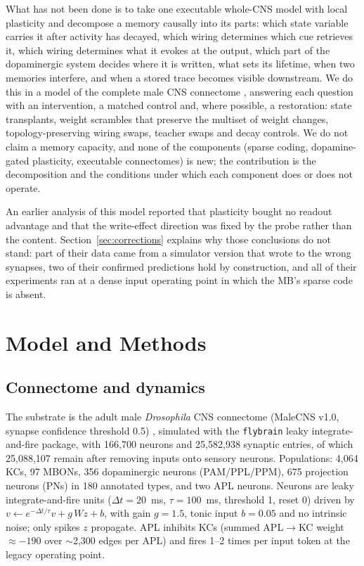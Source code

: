 \documentclass[conference]{IEEEtran}
\begin{document}
What has not been done is to take one executable whole-CNS model with local
plasticity and decompose a memory causally into its parts: which state variable
carries it after activity has decayed, which wiring determines which cue
retrieves it, which wiring determines what it evokes at the output, which part
of the dopaminergic system decides where it is written, what sets its lifetime,
when two memories interfere, and when a stored trace becomes visible
downstream. We do this in a model of the complete male CNS connectome
\cite{berg2026}, answering each question with an intervention, a matched
control and, where possible, a restoration: state transplants, weight scrambles
that preserve the multiset of weight changes, topology-preserving wiring swaps,
teacher swaps and decay controls. We do not claim a memory capacity, and none
of the components (sparse coding, dopamine-gated plasticity, executable
connectomes) is new; the contribution is the decomposition and the conditions
under which each component does or does not operate.

An earlier analysis of this model \cite{olddraft} reported that plasticity
bought no readout advantage and that the write-effect direction was fixed by
the probe rather than the content. Section~\ref{sec:corrections} explains why
those conclusions do not stand: part of their data came from a simulator
version that wrote to the wrong synapses, two of their confirmed predictions
hold by construction, and all of their experiments ran at a dense input
operating point in which the MB's sparse code is absent.

\section{Model and Methods}
\label{sec:methods}

\subsection{Connectome and dynamics}
The substrate is the adult male \textit{Drosophila} CNS connectome
(MaleCNS v1.0, synapse confidence threshold 0.5) \cite{berg2026}, simulated
with the \texttt{flybrain} leaky integrate-and-fire package, with 166{,}700
neurons and 25{,}582{,}938 synaptic entries, of which 25{,}088{,}107 remain
after removing inputs onto sensory neurons. Populations: 4{,}064 KCs, 97 MBONs,
356 dopaminergic neurons (PAM/PPL/PPM), 675 projection neurons (PNs) in 180
annotated types, and two APL neurons. Neurons are leaky integrate-and-fire
units ($\Delta t=20$~ms, $\tau=100$~ms, threshold 1, reset 0) driven by
$v\leftarrow e^{-\Delta t/\tau}v + g\,Wz + b$, with gain $g=1.5$, tonic input
$b=0.05$ and no intrinsic noise; only spikes $z$ propagate. APL inhibits KCs
(summed APL$\rightarrow$KC weight $\approx-190$ over $\sim$2{,}300 edges per APL)
and fires 1--2 times per input token at the legacy operating point.
\end{document}
